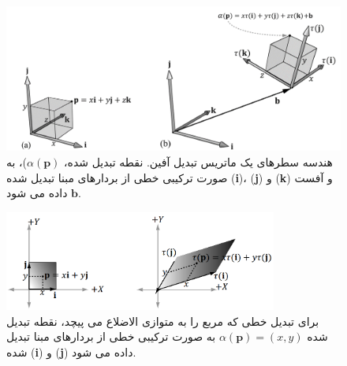 {\begin{spacing}{1.5}
        \begin{figure}[H]
            \centering
            \setlength{\belowcaptionskip}{-10pt}
            \includegraphics[width=\textwidth]{Images/4/3/4.Session.1.3.7}
            \caption {هندسه سطرهای یک ماتریس تبدیل آفین. نقطه تبدیل شده، $\alpha(\textbf{p})$)، به صورت ترکیبی خطی از بردارهای مبنا تبدیل شده \tau(\textbf{i})، \tau(\textbf{j}) و \tau(\textbf{k}) و آفست $\textbf{b}$ داده می شود.}
            \label{fig:4.Session.1.3.7}
        \end{figure}

        \begin{figure}[H]
            \centering
            \setlength{\belowcaptionskip}{-10pt}
            \includegraphics[width=0.8\textwidth]{Images/4/3/4.Session.1.3.8}
            \caption {برای تبدیل خطی که مربع را به متوازی الاضلاع می پیچد، نقطه تبدیل شده $\alpha(\textbf{p})=(x,y)$ به صورت ترکیبی خطی از بردارهای مبنا تبدیل شده \tau(\textbf{i}) و \tau(\textbf{j}) داده می شود.}
            \label{fig:4.Session.1.3.8}
        \end{figure}
    \end{spacing}
}


